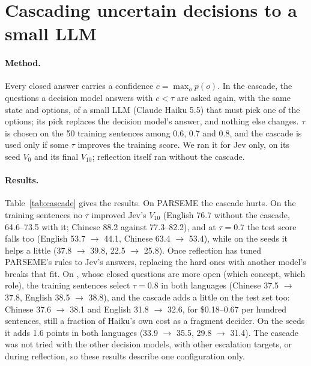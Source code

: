 \section{Cascading uncertain decisions to a small LLM}
\label{app:cascade}

\paragraph{Method.} Every closed answer carries a confidence $c=\max_o p(o)$. In the cascade, the questions a decision model answers with $c<\tau$ are asked again, with the same state and options, of a small LLM (Claude Haiku 5.5) that must pick one of the options; its pick replaces the decision model's answer, and nothing else changes. $\tau$ is chosen on the 50 training sentences among 0.6, 0.7 and 0.8, and the cascade is used only if some $\tau$ improves the training score. We ran it for Jev only, on its seed $V_0$ and its final $V_{10}$; reflection itself ran without the cascade.

\begin{table}[h]
\centering\small
\setlength{\tabcolsep}{4pt}
\resizebox{\columnwidth}{!}{}
\caption{The cascade from Jev to Haiku 5.5. Training: Jev's $V_{10}$ on the 50 training sentences without the cascade and at three values of $\tau$. Test: Jev's $V_0$ and $V_{10}$ without and with the cascade, at the selected $\tau$ (\umr: 0.8) or, where no $\tau$ helped on the training sentences (PARSEME), at $\tau=0.7$.}
\label{tab:cascade}
\end{table}

\paragraph{Results.} Table~\ref{tab:cascade} gives the results. On PARSEME the cascade hurts. On the training sentences no $\tau$ improved Jev's $V_{10}$ (English 76.7 without the cascade, 64.6--73.5 with it; Chinese 88.2 against 77.3--82.2), and at $\tau=0.7$ the test score falls too (English 53.7 $\to$ 44.1, Chinese 63.4 $\to$ 53.4), while on the seeds it helps a little (37.8 $\to$ 39.8, 22.5 $\to$ 25.8). Once reflection has tuned PARSEME's rules to Jev's answers, replacing the hard ones with another model's breaks that fit. On \umr, whose closed questions are more open (which concept, which role), the training sentences select $\tau=0.8$ in both languages (Chinese 37.5 $\to$ 37.8, English 38.5 $\to$ 38.8), and the cascade adds a little on the test set too: Chinese 37.6 $\to$ 38.1 and English 31.8 $\to$ 32.6, for \$0.18--0.67 per hundred sentences, still a fraction of Haiku's own cost as a fragment decider. On the seeds it adds 1.6 points in both languages (33.9 $\to$ 35.5, 29.8 $\to$ 31.4). The cascade was not tried with the other decision models, with other escalation targets, or during reflection, so these results describe one configuration only.

